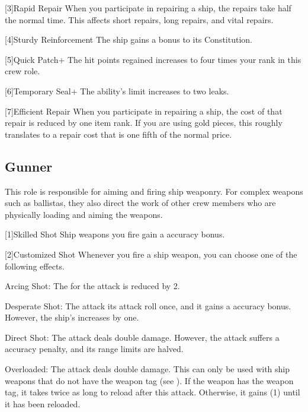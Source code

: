     [3]{Rapid Repair} When you participate in repairing a ship, the repairs take half the normal time.
      This affects short repairs, long repairs, and vital repairs.

    [4]{Sturdy Reinforcement} The ship gains a  bonus to its Constitution.

    [5]{Quick Patch+} The hit points regained increases to four times your rank in this crew role.

    [6]{Temporary Seal+} The ability's limit increases to two leaks.

    [7]{Efficient Repair} When you participate in repairing a ship, the cost of that repair is reduced by one item rank.
      If you are using gold pieces, this roughly translates to a repair cost that is one fifth of the normal price.

  \subsection{Gunner}
    This role is responsible for aiming and firing ship weaponry.
    For complex weapons such as ballistas, they also direct the work of other crew members who are physically loading and aiming the weapons.

    [1]{Skilled Shot} Ship weapons you fire gain a  accuracy bonus.

    [2]{Customized Shot} Whenever you fire a ship weapon, you can choose one of the following effects.
      \begin{raggeditemize}
        \item Arcing Shot: The  for the attack is reduced by 2.
        \item Desperate Shot: The attack  its attack roll once, and it gains a  accuracy bonus.
          However, the ship's  increases by one.
        \item Direct Shot: The attack deals double damage.
          However, the attack suffers a  accuracy penalty, and its range limits are halved.
        \item Overloaded: The attack deals double damage.
          This can only be used with ship weapons that do not have the  weapon tag (see ).
          If the weapon has the  weapon tag, it takes twice as long to reload after this attack.
          Otherwise, it gains  (1) until it has been reloaded.
      \end{raggeditemize}

